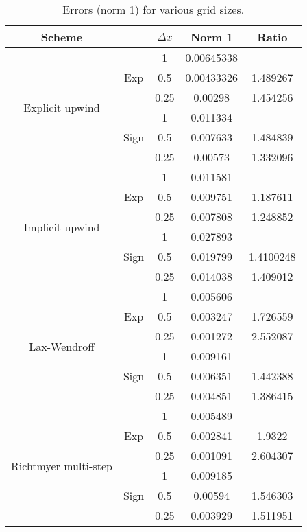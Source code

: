 	\begin{table}[]
		\centering
		\caption{Errors (norm 1) for various grid sizes.}
		\label{tab:ratiosGridConvergence}
		\begin{tabular}{|c|c|c|c|c|}
			\cline{1-1} \cline{3-5}
			\textbf{Scheme} & \textbf{} & \textbf{$\Delta x$} & \textbf{Norm 1} & \textbf{Ratio} \\ \hline \hline
			\multirow{6}{*}{Explicit upwind}
			& \multirow{3}{*}{Exp} & 1 & 0.00645338 &  \\ \cline{3-5} 
			&  & 0.5 & 0.00433326 & 1.489267\\ \cline{3-5} 
			&  & 0.25 & 0.00298 & 1.454256 \\ \cline{2-5} 
			& \multirow{3}{*}{Sign} & 1 & 0.011334 &  \\ \cline{3-5} 
			&  & 0.5 & 0.007633 & 1.484839 \\ \cline{3-5} 
			&  & 0.25 & 0.00573 & 1.332096 \\ \hline \hline
			\multirow{6}{*}{Implicit upwind}
			& \multirow{3}{*}{Exp} & 1 & 0.011581 &  \\ \cline{3-5} 
			&  & 0.5 & 0.009751 & 1.187611 \\ \cline{3-5} 
			&  & 0.25 & 0.007808 & 1.248852 \\ \cline{2-5} 
			& \multirow{3}{*}{Sign} & 1 & 0.027893 &  \\ \cline{3-5} 
			&  & 0.5 & 0.019799 & 1.4100248 \\ \cline{3-5} 
			&  & 0.25 & 0.014038 & 1.409012 \\ \hline \hline
			\multirow{6}{*}{Lax-Wendroff}
			& \multirow{3}{*}{Exp} & 1 & 0.005606 &  \\ \cline{3-5} 
			&  & 0.5 & 0.003247 & 1.726559 \\ \cline{3-5} 
			&  & 0.25 & 0.001272 & 2.552087 \\ \cline{2-5} 
			& \multirow{3}{*}{Sign} & 1 & 0.009161 &  \\ \cline{3-5} 
			&  & 0.5 & 0.006351 & 1.442388 \\ \cline{3-5} 
			&  & 0.25 & 0.004851 & 1.386415 \\ \hline \hline
			\multirow{6}{*}{Richtmyer multi-step}
			& \multirow{3}{*}{Exp} & 1 & 0.005489 &  \\ \cline{3-5} 
			&  & 0.5 & 0.002841 & 1.9322 \\ \cline{3-5} 
			&  & 0.25 & 0.001091 & 2.604307 \\ \cline{2-5} 
			& \multirow{3}{*}{Sign} & 1 & 0.009185 &  \\ \cline{3-5} 
			&  & 0.5 & 0.00594 & 1.546303 \\ \cline{3-5} 
			&  & 0.25 & 0.003929 & 1.511951 \\ \hline
		\end{tabular}
	\end{table}
	\clearpage